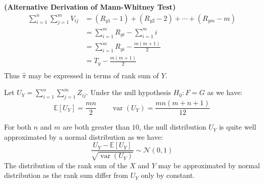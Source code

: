 \begin{remark}{\textbf{(Alternative Derivation of Mann-Whitney Test)}}
    \begin{equation*}
    \begin{aligned}
        \sum^n_{i=1}\sum^m_{j=1}V_{ij} &= (R_{y1} - 1) + (R_{y2} - 2) +\cdots + (R_{ym} - m) \\
        &= \sum^m_{i=1}R_{yi} - \sum^m_{i=1} i \\
        &= \sum^m_{i=1}R_{yi} - \frac{m(m+1)}{2} \\
        &= T_y - \frac{m(m+1)}{2} \\
    \end{aligned}
    \end{equation*}
    Thus $\hat{\pi}$ may be expressed in terms of rank sum of $Y$. 
\end{remark}

\begin{corollary}
    Let $U_Y = \sum _{i=1}^n \sum_{j=1}^m Z_{ij}$. Under the null hypothesis $H_0 : F = G$ as we have:
    \begin{equation*}
        \mathbb{E}[U_Y] = \frac{mn}{2} \qquad \operatorname{var}(U_Y) = \frac{mn(m+n+1)}{12}
    \end{equation*}
\end{corollary}

\begin{remark}
    For both $n$ and $m$ are both greater than $10$, the null distribution $U_Y$ is quite well approximated by a normal distribution as we have:
    \begin{equation*}
        \frac{U_Y - \mathbb{E}[U_Y]}{\sqrt{\operatorname{var}(U_Y)}}\sim \mathcal{N}(0, 1)
    \end{equation*}
    The distribution of the rank sum of the $X$ and $Y$ may be approximated by normal distribution as the rank sum differ from $U_Y$ only by constant. 
\end{remark}

